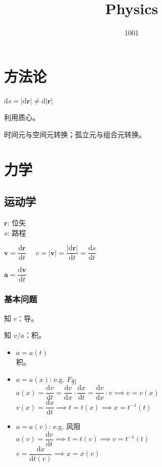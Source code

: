 \documentclass[12pt, a4paper, UTF8, openany]{ctexbook}
\title{Physics}
\author{1001}
\newcommand{\dif}{\mathrm{d}}
\newcommand{\vect}[1]{\mathbf{#1}}
\newcommand{\vecr}{\vect{r}}
\newcommand{\vecv}{\vect{v}}
\newcommand{\veca}{\vect{a}}
\begin{document}
    \maketitle

    \tableofcontents %
    \cleardoublepage %

    \chapter{方法论}
    $\dif s = |\dif \vect{r}| \neq \dif |\vect{r}|$

    利用质心。

    时间元与空间元转换；孤立元与组合元转换。

    \chapter{力学}

    \section{运动学}
    $\vecr$: 位矢 \\
    $s$: 路程

    $\vecv = \dfrac{\dif \vecr}{\dif t}\quad$
    $v = |\vecv| = \dfrac{|\dif \vecr|}{\dif t} = \dfrac{\dif s}{\dif t}$

    $\veca = \dfrac{\dif \vecv}{\dif t}$
    
        \subsection{基本问题}
            知 $r$：导。

            知 $v/a$：积。
            \begin{itemize}
                \item $a = a(t)$ \\
                    积。
                \item $a = a(x)$: e.g. $F_{\text{引}}$ \\
                    $a(x) = \dfrac{\dif v}{\dif t} = \dfrac{\dif v}{\dif x} \cdot \dfrac{\dif x}{\dif t} 
                    = \dfrac{\dif v}{\dif x} \cdot v \implies v = v(x)$ \\
                    $v(x) = \dfrac{\dif x}{\dif t} \implies t = t(x) \implies x = t^{-1}(t)$
                \item $a = a(v)$: e.g. 风阻 \\
                    $a(v) = \dfrac{\dif v}{\dif t} \implies t = t(v) \implies v = t^{-1}(t)$ \\
                    $v = \dfrac{\dif x}{\dif t(v)} \implies x = x(v)$
            \end{itemize}
\end{document}
